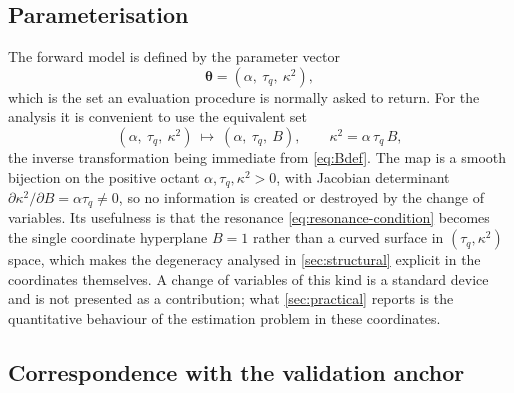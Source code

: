 \documentclass[preprint,12pt,a4paper]{elsarticle}
\theoremstyle{plain}
\theoremstyle{definition}
\theoremstyle{remark}
\newcommand{\tq}{\tau_{q}}
\newcommand{\kk}{\kappa^{2}}
\newcommand{\Bnum}{B}
\begin{document}
\subsection{Parameterisation}
\label{sec:model-param}

The forward model is defined by the parameter vector
%
\begin{equation}
  \bm{\theta} = (\alpha,\ \tq,\ \kk) ,
  \label{eq:theta}
\end{equation}
%
which is the set an evaluation procedure is normally asked to return. For the
analysis it is convenient to use the equivalent set
%
\begin{equation}
  (\alpha,\ \tq,\ \kk)
  \ \longmapsto\
  (\alpha,\ \tq,\ \Bnum) ,
  \qquad
  \kk = \alpha\, \tq\, \Bnum ,
  \label{eq:reparam}
\end{equation}
%
the inverse transformation being immediate from \eqref{eq:Bdef}. The map is a
smooth bijection on the positive octant $\alpha, \tq, \kk > 0$, with Jacobian
determinant $\partial \kk/\partial \Bnum = \alpha \tq \neq 0$, so no
information is created or destroyed by the change of variables. Its usefulness
is that the resonance \eqref{eq:resonance-condition} becomes the single
coordinate hyperplane $\Bnum = 1$ rather than a curved surface in
$(\tq, \kk)$ space, which makes the degeneracy analysed in
\cref{sec:structural} explicit in the coordinates themselves. A change of
variables of this kind is a standard device and is not presented as a
contribution; what \cref{sec:practical} reports is the quantitative behaviour
of the estimation problem in these coordinates.

\subsection{Correspondence with the validation anchor}
\label{sec:model-anchor}
\end{document}

